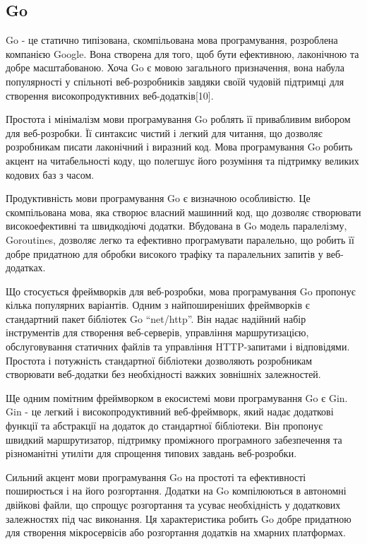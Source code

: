 \subsection{Go}
\label{subsec:go-subsection}

Go - це статично типізована, скомпільована мова програмування, розроблена компанією Google. Вона створена для того, щоб бути ефективною, лаконічною та добре масштабованою. Хоча Go є мовою загального призначення, вона набула популярності у спільноті веб-розробників завдяки своїй чудовій підтримці для створення високопродуктивних веб-додатків[10].

Простота і мінімалізм мови програмування Go роблять її привабливим вибором для веб-розробки. Її синтаксис чистий і легкий для читання, що дозволяє розробникам писати лаконічний і виразний код. Мова програмування Go робить акцент на читабельності коду, що полегшує його розуміння та підтримку великих кодових баз з часом.

Продуктивність мови програмування Go є визначною особливістю. Це скомпільована мова, яка створює власний машинний код, що дозволяє створювати високоефективні та швидкодіючі додатки. Вбудована в Go модель паралелізму, Goroutines, дозволяє легко та ефективно програмувати паралельно, що робить її добре придатною для обробки високого трафіку та паралельних запитів у веб-додатках.

Що стосується фреймворків для веб-розробки, мова програмування Go пропонує кілька популярних варіантів. Одним з найпоширеніших фреймворків є стандартний пакет бібліотек Go ``net/http''. Він надає надійний набір інструментів для створення веб-серверів, управління маршрутизацією, обслуговування статичних файлів та управління HTTP-запитами і відповідями. Простота і потужність стандартної бібліотеки дозволяють розробникам створювати веб-додатки без необхідності важких зовнішніх залежностей.

Ще одним помітним фреймворком в екосистемі мови програмування Go є Gin. Gin - це легкий і високопродуктивний веб-фреймворк, який надає додаткові функції та абстракції на додаток до стандартної бібліотеки. Він пропонує швидкий маршрутизатор, підтримку проміжного програмного забезпечення та різноманітні утиліти для спрощення типових завдань веб-розробки.

Сильний акцент мови програмування Go на простоті та ефективності поширюється і на його розгортання. Додатки на Go компілюються в автономні двійкові файли, що спрощує розгортання та усуває необхідність у додаткових залежностях під час виконання. Ця характеристика робить Go добре придатною для створення мікросервісів або розгортання додатків на хмарних платформах.

